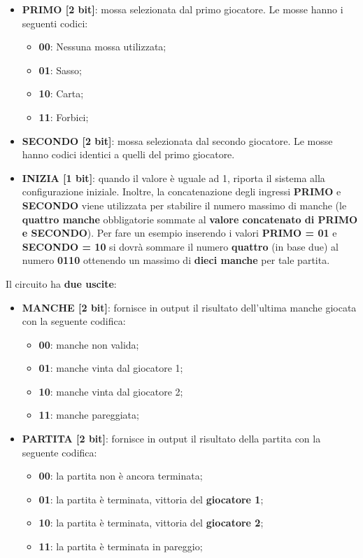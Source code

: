 \documentclass[a4paper]{article}
\begin{document}
\begin{itemize}
	\item \textbf{PRIMO [2 bit]}: mossa selezionata dal primo giocatore. Le mosse hanno i seguenti codici:
	      \begin{itemize}
		      \item \textbf{00}: Nessuna mossa utilizzata;
		      \item \textbf{01}: Sasso;
		      \item \textbf{10}: Carta;
		      \item \textbf{11}: Forbici;
	      \end{itemize}
	\item \textbf{SECONDO [2 bit]}: mossa selezionata dal secondo giocatore. Le mosse hanno codici identici a quelli del primo giocatore.
	\item \textbf{INIZIA [1 bit]}: quando il valore è uguale ad 1, riporta il sistema alla configurazione iniziale. Inoltre, la concatenazione degli ingressi \textbf{PRIMO} e \textbf{SECONDO} viene utilizzata per stabilire il numero massimo di manche (le \textbf{quattro manche} obbligatorie sommate al \textbf{valore concatenato di PRIMO e SECONDO}).
	      Per fare un esempio inserendo i valori \textbf{PRIMO = 01} e \textbf{SECONDO = 10} si dovrà sommare il numero \textbf{quattro} (in base due) al numero \textbf{0110} ottenendo un massimo di \textbf{dieci manche} per tale partita.
\end{itemize}
Il circuito ha \textbf{due uscite}:
\begin{itemize}
	\item \textbf{MANCHE [2 bit]}: fornisce in output il risultato dell'ultima manche giocata con la seguente codifica:
	      \begin{itemize}
		      \item \textbf{00}: manche non valida;
		      \item \textbf{01}: manche vinta dal giocatore 1;
		      \item \textbf{10}: manche vinta dal giocatore 2;
		      \item \textbf{11}: manche pareggiata;
	      \end{itemize}
	\item \textbf{PARTITA [2 bit]}: fornisce in output il risultato della partita con la seguente codifica:
	      \begin{itemize}
		      \item \textbf{00}: la partita non è ancora terminata;
		      \item \textbf{01}: la partita è terminata, vittoria del \textbf{giocatore 1};
          \item \textbf{10}: la partita è terminata, vittoria del \textbf{giocatore 2};
		      \item \textbf{11}: la partita è terminata in pareggio;
	      \end{itemize}
\end{itemize}
\end{document}

